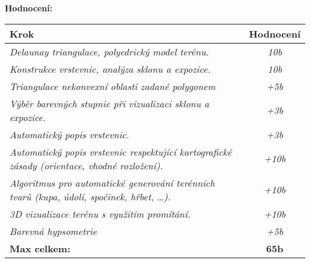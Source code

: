 \par\textbf{\large Hodnocení:}
\begin{center}
    \begin{tabular}{|p{14.2cm}|c|} 
     \hline\large
         \textbf{Krok} & \textbf{Hodnocení}\\ %
             \hline\hline
             \small \emph{Delaunay triangulace, polyedrický model terénu.}  & \emph{\small10b} \\ 
             \hline
             \emph{\small Konstrukce vrstevnic, analýza sklonu a expozice.} & \emph{\small 10b} \\
             \hline
             \emph{\small Triangulace nekonvexní oblasti zadané polygonem} & \emph{\small +5b} \\
             \hline
             \emph{\small Výběr barevných stupnic při vizualizaci sklonu a expozice.} & \emph{\small +3b} \\
             \hline
             \emph{\small Automatický popis vrstevnic.} & \emph{\small +3b}\\ 
             \hline
             \emph{\small Automatický popis vrstevnic respektující kartografické zásady (orientace, vhodné rozložení).} & \emph{\small +10b}\\ 
             \hline
             \emph{\small Algoritmus pro automatické generování terénních tvarů (kupa, údolí, spočinek, hřbet, \dots).} & \emph{\small +10b}\\ 
             \hline
             \emph{\small 3D vizualizace terénu s využitím promítání.} & \emph{\small +10b}\\ 
             \hline
             \emph{\small Barevná hypsometrie} & \emph{\small +5b}\\ 
             \hline
             \textbf{Max celkem:} & \textbf{65b}\\ %
             \hline
    \end{tabular}
\end{center}
